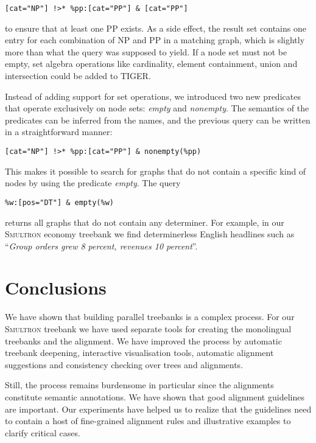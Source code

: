 \documentclass[output=paper]{LSP/langsci}
\begin{document}
\ea
\begin{lstlisting}
[cat="NP"] !>* %pp:[cat="PP"] & [cat="PP"] 
\end{lstlisting}
\z

\noindent to ensure that at least one PP exists. As a side effect, the result set contains one entry for each combination of NP and PP in a matching graph, which is slightly more than what the query was supposed to yield. If a node set must not be empty, set algebra operations like cardinality, element containment, union and intersection could be added to TIGER. 

Instead of adding support for set operations, we introduced two new predicates that operate exclusively on node sets: \textit{empty} and \textit{nonempty}. The semantics of the predicates can be inferred from the names, and the previous query can be written in a straightforward manner:

\ea
\begin{lstlisting}
[cat="NP"] !>* %pp:[cat="PP"] & nonempty(%pp)
\end{lstlisting}
\z

This makes it possible to search for graphs that do not contain a specific kind of nodes by using the predicate \textit{empty}. The query

\ea
\begin{lstlisting}
%w:[pos="DT"] & empty(%w)
\end{lstlisting}
\z

\noindent returns all graphs that do not contain any determiner. For example, in our S\textsc{multron} economy treebank we find determinerless English headlines such as ``\textit{Group orders grew 8 percent, revenues 10 percent}''. 

\section{Conclusions}\label{sec:volk:4}

We have shown that building parallel treebanks is a complex process. For our \textsc{Smultron} treebank we have used separate tools for creating the monolingual treebanks and the alignment. We have improved the process by automatic treebank deepening, interactive visualisation tools, automatic alignment suggestions and consistency checking over trees and alignments. 

Still, the process remains burdensome in particular since the alignments constitute semantic annotations. We have shown that good alignment guidelines are important. Our experiments have helped us to realize that the guidelines need to contain a host of fine-grained alignment rules and illustrative examples to clarify critical cases. 
\end{document}
